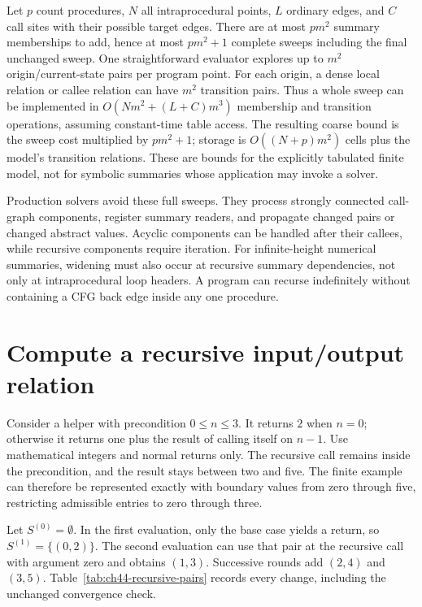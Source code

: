 Let $p$ count procedures, $N$ all intraprocedural points, $L$ ordinary edges, and $C$ call sites with their possible target edges.
There are at most $pm^2$ summary memberships to add, hence at most $pm^2+1$ complete sweeps including the final unchanged sweep.
One straightforward evaluator explores up to $m^2$ origin/current-state pairs per program point.
For each origin, a dense local relation or callee relation can have $m^2$ transition pairs.
Thus a whole sweep can be implemented in $O(Nm^2+(L+C)m^3)$ membership and transition operations, assuming constant-time table access.
The resulting coarse bound is the sweep cost multiplied by $pm^2+1$; storage is $O((N+p)m^2)$ cells plus the model's transition relations.
These are bounds for the explicitly tabulated finite model, not for symbolic summaries whose application may invoke a solver.

Production solvers avoid these full sweeps.
They process strongly connected call-graph components, register summary readers, and propagate changed pairs or changed abstract values.
Acyclic components can be handled after their callees, while recursive components require iteration.
For infinite-height numerical summaries, widening must also occur at recursive summary dependencies, not only at intraprocedural loop headers.
A program can recurse indefinitely without containing a CFG back edge inside any one procedure.

\section{Compute a recursive input/output relation}
\label{sec:ch44-recursive-example}

Consider a helper with precondition $0\leq n\leq3$.
It returns $2$ when $n=0$; otherwise it returns one plus the result of calling itself on $n-1$.
Use mathematical integers and normal returns only.
The recursive call remains inside the precondition, and the result stays between two and five.
The finite example can therefore be represented exactly with boundary values from zero through five, restricting admissible entries to zero through three.

Let $S^{(0)}=\emptyset$.
In the first evaluation, only the base case yields a return, so $S^{(1)}=\{(0,2)\}$.
The second evaluation can use that pair at the recursive call with argument zero and obtains $(1,3)$.
Successive rounds add $(2,4)$ and $(3,5)$.
Table~\ref{tab:ch44-recursive-pairs} records every change, including the unchanged convergence check.

